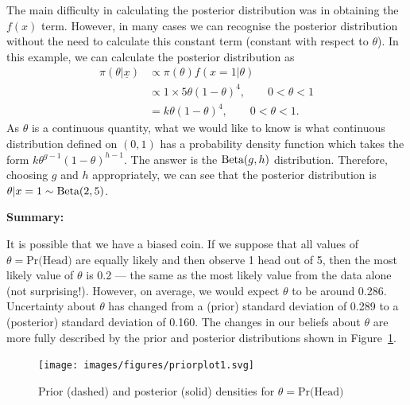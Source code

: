 {{    
}


\newpage




{
    
}

\newpage

The main difficulty in calculating the posterior distribution was in obtaining the $f(x)$ term. However, in many cases we can recognise the posterior distribution without the need to calculate this constant term (constant with respect to $\theta$). In this example, we can calculate the posterior distribution as
\begin{align*}
\pi(\theta|\underline{x})&\propto\pi(\theta)f(x=1|\theta) \\
&\propto 1\times 5\theta(1-\theta)^4,\quad\quad 0<\theta<1  \\
&=k\theta(1-\theta)^4,\quad\quad 0<\theta<1.
\end{align*}
As $\theta$ is a continuous quantity, what we would like to know is what continuous distribution defined on $(0,1)$ has a probability density function which takes the form $k\theta^{g-1}(1-\theta)^{h-1}$. The answer is the $\textnormal{\text{Beta}}(g,h)$ distribution. Therefore, choosing $g$ and $h$ appropriately, we can see that the posterior distribution is $\theta|x=1\sim \textnormal{\text{Beta}}(2,5)$.

\textbf{Summary:}

It is possible that we have a biased coin. If we suppose that all values of $\theta=\text{Pr(Head)}$ are equally likely and then observe 1 head out of 5, then the most likely value of $\theta$ is 0.2 --- the same as the most likely value from the data alone (not surprising!). However, on average, we would expect $\theta$ to be around 0.286. Uncertainty about $\theta$ has changed from a (prior) standard deviation of 0.289 to a (posterior) standard deviation of 0.160. The changes in our beliefs about $\theta$ are more fully described by the prior and posterior distributions shown in Figure~\ref{fig:betaplot2}.
\begin{figure}[ht]

\texttt{[image: images/figures/priorplot1.svg]}
\caption{Prior (dashed) and posterior (solid) densities for $\theta=\text{Pr(Head)}$}
\label{fig:betaplot2}

\end{figure}}
\newpage
